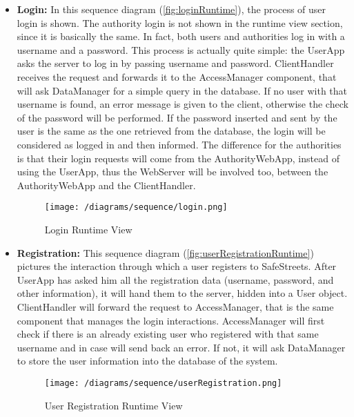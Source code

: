 			\begin{itemize}
				\item \textbf{Login:} In this sequence diagram (\autoref{fig:loginRuntime}), the process of user login is shown. The authority login is not shown in the runtime view section, since it is basically the same. In fact, both users and authorities log in with a username and a password. This process is actually quite simple: the UserApp asks the server to log in by passing username and password. ClientHandler receives the request and forwards it to the AccessManager component, that will ask DataManager for a simple query in the database. If no user with that username is found, an error message is given to the client, otherwise the check of the password will be performed. If the password inserted and sent by the user is the same as the one retrieved from the database, the login will be considered as logged in and then informed.
				The difference for the authorities is that their login requests will come from  the AuthorityWebApp, instead of using the UserApp, thus the WebServer will be involved too, between the AuthorityWebApp and the ClientHandler.
				
				\begin{figure}[h!]
					\centering
					\texttt{[image: /diagrams/sequence/login.png]}
					\caption{\label{fig:loginRuntime} Login Runtime View}
				\end{figure}
			
				\item \textbf{Registration:} This sequence diagram (\autoref{fig:userRegistrationRuntime}) pictures the interaction through which a user registers to SafeStreets. After UserApp has asked him all the registration data (username, password, and other information), it will hand them to the server, hidden into a User object. ClientHandler will forward the request to AccessManager, that is the same component that manages the login interactions. AccessManager will first check if there is an already existing user who registered with that same username and in case will send back an error. If not, it will ask DataManager to store the user information into the database of the system.
				
				\begin{figure}[h!]
					\centering
					\texttt{[image: /diagrams/sequence/userRegistration.png]}
					\caption{\label{fig:userRegistrationRuntime} User Registration Runtime View}
				\end{figure}
			

\end{itemize}

